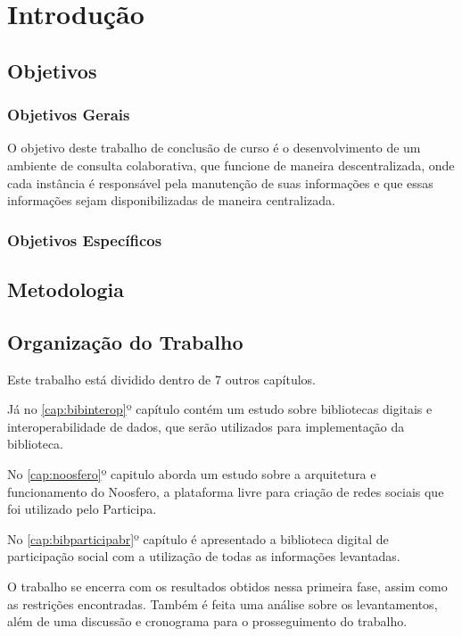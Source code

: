 \chapter{Introdução}


\section{Objetivos}

\subsection{Objetivos Gerais}

O objetivo deste trabalho de conclusão de curso é o desenvolvimento de um ambiente de consulta colaborativa, que funcione de maneira descentralizada, onde cada instância é responsável pela manutenção de suas informações e que essas informações sejam disponibilizadas de maneira centralizada. 

\subsection{Objetivos Específicos}
	 	

\section{Metodologia}


\section{Organização do Trabalho}

Este trabalho está dividido dentro de 7 outros capítulos. 

Já no \ref{cap:bibinterop}º capítulo contém um estudo sobre bibliotecas digitais e interoperabilidade de dados, que serão utilizados para implementação da biblioteca.

No \ref{cap:noosfero}º capitulo aborda um estudo sobre a arquitetura e funcionamento do Noosfero, a plataforma livre para criação de redes sociais que foi utilizado pelo Participa.

No \ref{cap:bibparticipabr}º capítulo é apresentado a biblioteca digital de participação social com a utilização de todas as informações levantadas.

O trabalho se encerra com os resultados obtidos nessa primeira fase, assim como as restrições encontradas. Também é feita uma análise sobre os levantamentos, além de uma discussão e cronograma para o prosseguimento do trabalho.
